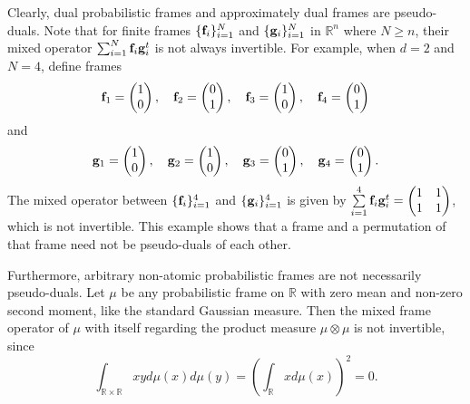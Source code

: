 \documentclass{amsart}
\numberwithin{equation}{section}
\newcommand\R{{\mathbb R}}
\theoremstyle{plain}
\theoremstyle{remark}
\theoremstyle{definition}
\begin{document}
Clearly, dual probabilistic frames and approximately dual frames are pseudo-duals. Note that for finite frames $\{{\bf f}_i\}_{i=1}^N$ and $\{{\bf g}_i\}_{i=1}^N$ in $\mathbb{R}^n$ where $N\geq n$, their mixed operator $\sum_{i=1}^N {\bf f}_i {\bf g}_i^t$ is not always invertible. For example, when $d=2$ and $N=4$, define frames
$${\bf f}_1 = \begin{pmatrix} 1 \\ 0 \end{pmatrix}, \quad {\bf f}_2 = \begin{pmatrix} 0 \\ 1 \end{pmatrix}, \quad {\bf f}_3 = \begin{pmatrix} 1 \\ 0 \end{pmatrix}, \quad {\bf f}_4 = \begin{pmatrix} 0 \\ 1 \end{pmatrix}$$
and
$${\bf g}_1 = \begin{pmatrix} 1 \\ 0 \end{pmatrix}, \quad {\bf g}_2 = \begin{pmatrix} 1 \\ 0 \end{pmatrix}, \quad {\bf g}_3 = \begin{pmatrix} 0 \\ 1 \end{pmatrix}, \quad {\bf g}_4 = \begin{pmatrix} 0 \\ 1 \end{pmatrix}.$$
The mixed operator between $\{{\bf f}_i\}_{i=1}^4$ and $\{{\bf g}_i\}_{i=1}^4$ is given by
$\sum\limits_{i=1}^4 {\bf f}_i {\bf g}_i^t = \begin{pmatrix} 1 & 1 \\ 1 & 1 \end{pmatrix}$, which is not invertible. This example shows that a frame and a permutation of that frame need not be pseudo-duals of each other.

Furthermore, arbitrary non-atomic probabilistic frames are not necessarily pseudo-duals. Let $\mu$ be any probabilistic frame on $\R$ with zero mean and non-zero second moment, like the standard Gaussian measure. Then the mixed frame operator of $\mu$ with itself regarding the product measure $\mu \otimes \mu$ is not invertible, since
$$\int_{\mathbb{R} \times \mathbb{R}} xy d\mu(x) d\mu(y) = \left(\int_{\mathbb{R}} x d\mu(x)\right)^2 =0.$$
\end{document}
